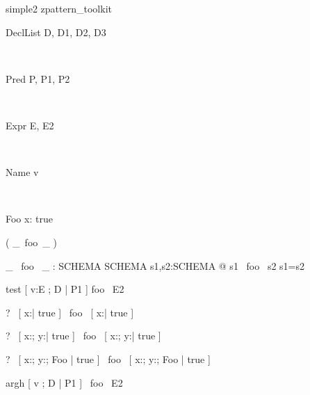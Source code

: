 \begin{zsection}
\SECTION simple2 \parents zpattern\_toolkit
\end{zsection}

\newcommand{\unfoldsTo}{\mathrel{\leadsto}}

\begin{zedjoker}{DeclList} D, D1, D2, D3\end{zedjoker} \\
\begin{zedjoker}{Pred} P, P1, P2\end{zedjoker} \\
\begin{zedjoker}{Expr} E, E2\end{zedjoker} \\
\begin{zedjoker}{Name} v\end{zedjoker} \\

\begin{schema}{Foo}
  x:\nat
\where
  true
\end{schema}

\begin{zed}
  \relation ( \_~foo~\_ )
\end{zed}

\begin{gendef}[SCHEMA]
  \_ ~foo~ \_ : SCHEMA \rel SCHEMA
\where
  \forall s1,s2:SCHEMA @ s1 ~foo~ s2 \iff s1=s2
\end{gendef}

\begin{zedrule}{test}
  [ v:E ; D | P1 ] foo~ E2
\end{zedrule}

\begin{zed}
  \vdash?~ [ x:\nat | true ] ~foo~ [ x:\nat | true ]
\end{zed}

\begin{zed}
  \vdash?~ [ x:\nat; y:\nat | true ] ~foo~ [ x:\nat; y:\nat | true ]
\end{zed}

\begin{zed}
  \vdash?~ [ x:\nat; y:\nat ; Foo | true ] ~foo~
           [ x:\nat; y:\nat ; Foo | true ]
\end{zed}


\begin{zedrule}{argh}
  [ v ; D | P1 ] ~foo~ E2
\end{zedrule}

